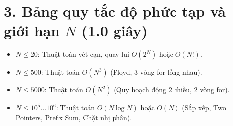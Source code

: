 \documentclass[11pt,a4paper]{article}
\begin{document}
\section*{\color{AsianDarkBlue}3. Bảng quy tắc độ phức tạp và giới hạn $N$ (1.0 giây)}
\begin{tcolorbox}[colback=red!5!white,colframe=red!75!black,title=\textbf{QUY TẮC PHÂN TÍCH THUẬT TOÁN THEO SUBTASK}]
\begin{itemize}
    \item $N \le 20$: Thuật toán vét cạn, quay lui $O(2^N)$ hoặc $O(N!)$.
    \item $N \le 500$: Thuật toán $O(N^3)$ (Floyd, 3 vòng for lồng nhau).
    \item $N \le 5000$: Thuật toán $O(N^2)$ (Quy hoạch động 2 chiều, 2 vòng for).
    \item $N \le 10^5 \dots 10^6$: Thuật toán $O(N \log N)$ hoặc $O(N)$ (Sắp xếp, Two Pointers, Prefix Sum, Chặt nhị phân).
\end{itemize}
\end{tcolorbox}
\end{document}
